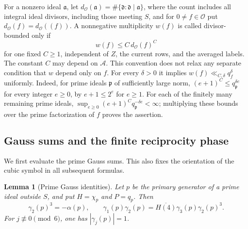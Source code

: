 \documentclass[11pt,a4paper]{article}
\numberwithin{equation}{section}
\numberwithin{figure}{section}
\newtheorem{lemma}[theorem]{Lemma}
\theoremstyle{definition}
\theoremstyle{remark}
\begin{document}
For a nonzero ideal $\mathfrak a$, let
$d_{\mathcal O}(\mathfrak a)=\#\{\mathfrak d:\mathfrak d\mid\mathfrak a\}$,
where the count includes all integral ideal divisors, including those meeting
$S$, and for $0\ne f\in\mathcal O$ put
$d_{\mathcal O}(f)=d_{\mathcal O}((f))$.
A nonnegative multiplicity $w(f)$ is called divisor-bounded only if
\[
 w(f)\le C\,d_{\mathcal O}(f)^C
\]
for one fixed $C\ge1$, independent of $Z$, the current rows, and the averaged
labels.  The constant $C$ may depend on $\mathcal A$.
This convention does not relax any separate condition that $w$ depend only on
$f$.  For every $\delta>0$ it implies $w(f)\ll_{C,\delta}q_f^\delta$
uniformly.  Indeed, for prime ideals $\mathfrak p$ of sufficiently large norm,
$(e+1)^C\le q_{\mathfrak p}^{\delta e}$ for every integer $e\ge0$, by
$e+1\le2^e$ for $e\ge1$.  For each of the finitely many remaining prime ideals,
$\sup_{e\ge0}(e+1)^Cq_{\mathfrak p}^{-\delta e}<\infty$; multiplying these
bounds over the prime factorization of $f$ proves the assertion.

\subsection{Gauss sums and the finite reciprocity phase}

We first evaluate the prime Gauss sums.  This also fixes the orientation of
the cubic symbol in all subsequent formulas.

\begin{lemma}[Prime Gauss identities]\label{lem:prime-gauss-identities}
Let $p$ be the primary generator of a prime ideal outside $S$, and put
$H=\chi_p$ and $P=q_p$.  Then
\[
 \gamma_2(p)^3=-\alpha(p),\qquad
 \gamma_1(p)\gamma_2(p)
   =\overline{H(4)}\gamma_3(p)\gamma_2(p)^3.
\]
For $j\not\equiv0\pmod6$, one has $|\gamma_j(p)|=1$.
\end{lemma}
\end{document}
